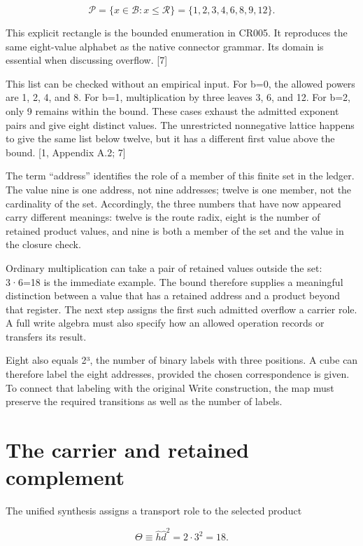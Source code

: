 \documentclass[10pt,twocolumn,letterpaper]{article}
\begin{document}
\begin{equation}
\mathcal P=\{x\in\mathcal B:x\le\mathcal R\}
=\{1,2,3,4,6,8,9,12\}.
\end{equation}

This explicit rectangle is the bounded enumeration in CR005. It reproduces the same eight-value alphabet as the native connector grammar. Its domain is essential when discussing overflow. {[}7{]}

This list can be checked without an empirical input. For b=0, the allowed powers are 1, 2, 4, and 8. For b=1, multiplication by three leaves 3, 6, and 12. For b=2, only 9 remains within the bound. These cases exhaust the admitted exponent pairs and give eight distinct values. The unrestricted nonnegative lattice happens to give the same list below twelve, but it has a different first value above the bound. {[}1, Appendix A.2; 7{]}

The term ``address'' identifies the role of a member of this finite set in the ledger. The value nine is one address, not nine addresses; twelve is one member, not the cardinality of the set. Accordingly, the three numbers that have now appeared carry different meanings: twelve is the route radix, eight is the number of retained product values, and nine is both a member of the set and the value in the closure check.

Ordinary multiplication can take a pair of retained values outside the set: 3·6=18 is the immediate example. The bound therefore supplies a meaningful distinction between a value that has a retained address and a product beyond that register. The next step assigns the first such admitted overflow a carrier role. A full write algebra must also specify how an allowed operation records or transfers its result.

Eight also equals 2³, the number of binary labels with three positions. A cube can therefore label the eight addresses, provided the chosen correspondence is given. To connect that labeling with the original Write construction, the map must preserve the required transitions as well as the number of labels.

\section{The carrier and retained complement}\label{the-carrier-and-retained-complement}

The unified synthesis assigns a transport role to the selected product

\begin{equation}
\Theta\equiv\hat h\hat d^2=2\cdot3^2=18.
\end{equation}
\end{document}
